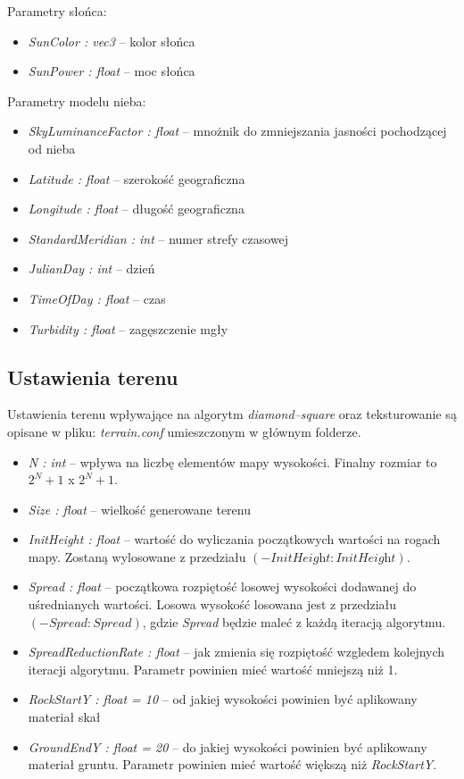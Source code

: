 \documentclass[inz,longabstract]{iithesis}
\begin{document}
        Parametry słońca:
        \begin{itemize}
            \item \textit{SunColor : vec3} -- kolor słońca 
            \item \textit{SunPower : float} -- moc słońca
        \end{itemize}
        
        Parametry modelu nieba:
        \begin{itemize}
            \item \textit{SkyLuminanceFactor : float} -- mnożnik do zmniejszania jasności pochodzącej od nieba
            \item \textit{Latitude : float} -- szerokość geograficzna
            \item \textit{Longitude : float} -- długość geograficzna
            \item \textit{StandardMeridian : int} -- numer strefy czasowej
            \item \textit{JulianDay : int} -- dzień
            \item \textit{TimeOfDay : float} -- czas
            \item \textit{Turbidity : float} -- zagęszczenie mgły 
        \end{itemize}
        
        \subsection{Ustawienia terenu}
        Ustawienia terenu wpływające na algorytm \textit{diamond--square} oraz teksturowanie są opisane w pliku: \textit{terrain.conf} umieszczonym w głównym folderze.
        
        \begin{itemize}
            \item \textit{N : int} -- wpływa na liczbę elementów mapy wysokości. Finalny rozmiar to $2^N+1$ x $2^N+1$.
            \item \textit{Size : float} -- wielkość generowane terenu 
            \item \textit{InitHeight : float} -- wartość do wyliczania początkowych wartości na rogach mapy. Zostaną wylosowane z przedziału $(-\textit{InitHeight}:\textit{InitHeight})$.
            \item \textit{Spread : float} -- początkowa rozpiętość losowej wysokości dodawanej do uśrednianych wartości. Losowa wysokość losowana jest z przedziału $(-\textit{Spread}:\textit{Spread})$, gdzie \textit{Spread} będzie maleć z każdą iteracją algorytmu.
            \item \textit{SpreadReductionRate : float} -- jak zmienia się rozpiętość wzgledem kolejnych iteracji algorytmu. Parametr powinien mieć wartość mniejszą niż 1. 
            \item \textit{RockStartY : float = 10} -- od jakiej wysokości powinien być aplikowany materiał skał
            \item \textit{GroundEndY : float = 20} -- do jakiej wysokości powinien być aplikowany materiał gruntu. Parametr powinien mieć wartość większą niż \textit{RockStartY}. 
        \end{itemize}
        
\end{document}
